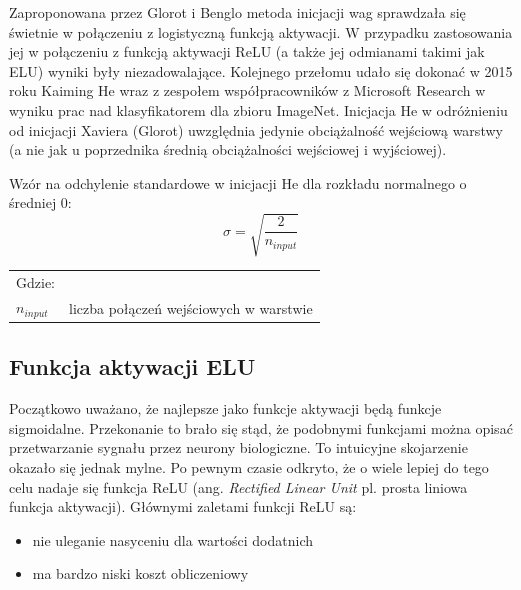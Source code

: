 \documentclass[a4paper,11pt]{article}
\begin{document}
    \bigskip

    Zaproponowana przez Glorot i Benglo metoda inicjacji wag sprawdzała się świetnie w połączeniu z logistyczną funkcją aktywacji. W przypadku zastosowania jej w połączeniu z funkcją aktywacji ReLU (a także jej odmianami takimi jak ELU) wyniki były niezadowalające. Kolejnego przełomu udało się dokonać w 2015 roku Kaiming He wraz z zespołem współpracowników z Microsoft Research w wyniku prac nad klasyfikatorem dla zbioru ImageNet\cite{DelvingDeepIntoRectifiers2015}. Inicjacja He w odróżnieniu od inicjacji Xaviera (Glorot) uwzględnia jedynie obciążalność wejściową warstwy (a nie jak u poprzednika średnią obciążalności wejściowej i wyjściowej)\cite{UczenieMaszynowe2018}.

    \bigskip

    \noindent
    \begin{minipage}[H]{\textwidth}
        \setlength\parindent{17pt} Wzór na odchylenie standardowe w inicjacji He dla rozkładu normalnego o średniej 0: \\
        \begin{equation}
            \label{eq:std_dev_he}
            \sigma = \sqrt{\frac{2}{n_{input}}}
        \end{equation}
        \smallskip
        \begin{tabular}{p{}p{}}
            Gdzie: \\
            $n_{input}$ & liczba połączeń wejściowych w warstwie \\
        \end{tabular}
    \end{minipage}

    \subsection{Funkcja aktywacji ELU}

    Początkowo uważano, że najlepsze jako funkcje aktywacji będą funkcje sigmoidalne. Przekonanie to brało się stąd, że podobnymi funkcjami można opisać przetwarzanie sygnału przez neurony biologiczne. To intuicyjne skojarzenie okazało się jednak mylne. Po pewnym czasie odkryto, że o wiele lepiej do tego celu nadaje się funkcja ReLU (ang. \textit{Rectified Linear Unit} pl. prosta liniowa funkcja aktywacji)\cite{UczenieMaszynowe2018}. Głównymi zaletami funkcji ReLU są:
    \begin{itemize}
        \item nie uleganie nasyceniu dla wartości dodatnich
        \item ma bardzo niski koszt obliczeniowy
    \end{itemize}
\end{document}
